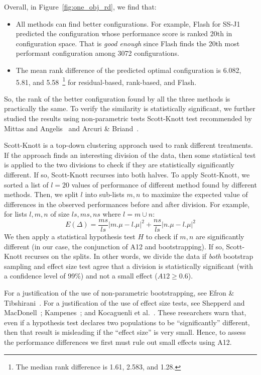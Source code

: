 \documentclass[10pt,journal,compsoc]{IEEEtran}
\newcommand{\flash}{{\sc Flash}\xspace}
\begin{document}
\noindent Overall, in Figure~\ref{fig:one_obj_rd}, we find that:
\begin{itemize}[leftmargin=*]
    \item All methods can find better configurations. For example, \flash for SS-J1 predicted the configuration whose performance score is ranked 20th in configuration space. That is \textit{good enough} since \flash finds the 20th most performant configuration among 3072 configurations.%
    \item The mean rank difference of the predicted optimal configuration is 6.082, 5.81, and 5.58~\footnote{The median rank difference is 1.61, 2.583, and 1.28.} for residual-based, rank-based, and \flash. 
\end{itemize}
So, the rank of the better configuration found by all the three methods is practically the same. To verify the similarity is statistically significant, we further studied the results using non-parametric tests Scott-Knott test  recommended by Mittas and Angelis~\cite{mittas13} and Arcuri \& Briand~\cite{mittas13}.


Scott-Knott is a top-down clustering approach used to rank different treatments. If the approach finds an interesting division of the data, then some 
statistical test is applied to the two divisions to check if they are 
statistically significantly different. If so, Scott-Knott recurses into both 
halves.
To  apply Scott-Knott, we sorted a list of  $l=20$ values of performance of different method found by different methods. Then, we split $l$ into 
sub-lists $m,n$ to maximize the expected value of differences in 
the observed performances before and after division. For example, for lists 
$l,m,n$ of size $ls,ms,ns$ where $l=m\cup n$: 
\[E(\Delta)=\frac{ms}{ls}|m.\mu - l.\mu|^2 + \frac{ns}{ls}|n.\mu - 
l.\mu|^2\] 
We then apply a   statistical hypothesis test $H$ to check
if $m,n$ are significantly different  (in our case, the conjunction of A12 
and bootstrapping). If so, Scott-Knott recurses on the splits. In other 
words, we divide the data if \textit{both} bootstrap sampling and effect 
size test agree that a division is statistically significant (with a 
confidence level of 99\%) and not a small effect ($A12 \ge 0.6$).

For a justification of the use of non-parametric bootstrapping, see Efron 
\& Tibshirani~\cite[p220-223]{efron93}. For a justification of the use of 
effect size tests, see Shepperd and MacDonell~\cite{shepperd12a}; 
Kampenes~\cite{kampenes07}; and Kocaguenli et 
al.~\cite{Kocaguneli2013:ep}. These researchers warn that, even if a 
hypothesis test declares two populations to be ``significantly'' 
different, then that result is misleading if the ``effect size'' is very 
small. Hence, to assess the performance differences we first must rule out 
small effects using A12.
\end{document}
